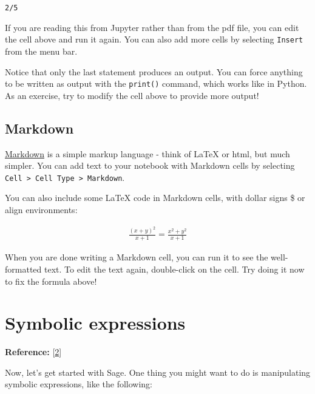 \documentclass[11pt]{article}
\makeatletter
\newcommand{\boxspacing}{\kern\kvtcb@left@rule\kern\kvtcb@boxsep}
\newcommand{\prompt}[4]{
        \ttfamily\llap{{\color{#2}[#3]:\hspace{3pt}#4}}\vspace{-\baselineskip}
    }
\makeatother
\begin{document}
            \begin{tcolorbox}[breakable, size=fbox, boxrule=.5pt, pad at break*=1mm, opacityfill=0]
\prompt{Out}{outcolor}{2}{\boxspacing}
\begin{Verbatim}[commandchars=\\\{\}]
2/5
\end{Verbatim}
\end{tcolorbox}
        
    If you are reading this from Jupyter rather than from the pdf file, you
can edit the cell above and run it again. You can also add more cells by
selecting \texttt{Insert} from the menu bar.

Notice that only the last statement produces an output. You can force
anything to be written as output with the \texttt{print()} command,
which works like in Python. As an exercise, try to modify the cell above
to provide more output!

    \hypertarget{markdown}{%
\subsection{Markdown}\label{markdown}}

\href{https://en.wikipedia.org/wiki/Markdown}{Markdown} is a simple
markup language - think of LaTeX or html, but much simpler. You can add
text to your notebook with Markdown cells by selecting
\texttt{Cell\ \textgreater{}\ Cell\ Type\ \textgreater{}\ Markdown}.

You can also include some LaTeX code in Markdown cells, with dollar
signs \$ or align environments:

\begin{align*}
\frac{(x+y)^2}{x+1} = \frac{x^2+y^2}{x+1}
\end{align*}

When you are done writing a Markdown cell, you can run it to see the
well-formatted text. To edit the text again, double-click on the cell.
Try doing it now to fix the formula above!

    \hypertarget{symbolic-expressions}{%
\section{Symbolic expressions}\label{symbolic-expressions}}

\textbf{Reference:}
{[}\href{https://doc.sagemath.org/html/en/reference/calculus/sage/symbolic/expression.html}{2}{]}

Now, let's get started with Sage. One thing you might want to do is
manipulating symbolic expressions, like the following:
\end{document}
